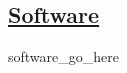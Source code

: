 \documentclass[11pt,a4paper,roman]{moderncv} %
\begin{document}



    \subsection{\underline{Software}}
{{software_go_here}}
\end{document}
